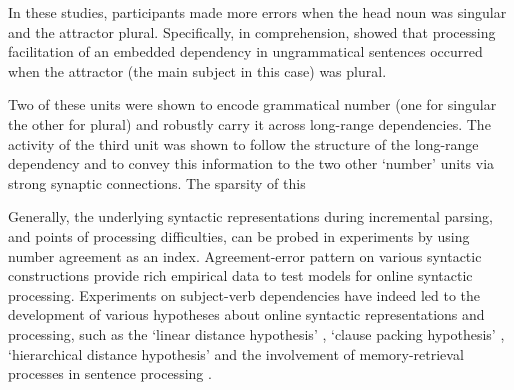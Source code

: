 In these studies, participants made more errors when the head noun was singular and the attractor plural. Specifically, in comprehension, \citet{wagers2009agreement} showed that processing facilitation of an embedded dependency in ungrammatical sentences occurred when the attractor (the main subject in this case) was plural.




Two of these units were shown to encode grammatical number (one for singular the other for plural) and robustly carry it across long-range dependencies. The activity of the third unit was shown to follow the structure of the long-range dependency and to convey this information to the two other `number' units via strong synaptic connections. The sparsity of this 


Generally, the underlying syntactic representations during incremental parsing, and points of processing difficulties, can be probed in experiments by using number agreement as an index. Agreement-error pattern on various syntactic constructions provide rich empirical data to test models for online syntactic processing. Experiments on subject-verb dependencies have indeed led to the development of various hypotheses about online syntactic representations and processing, such as the `linear distance hypothesis' \citep{}, `clause packing hypothesis' \citep{Bock:Miller:1991}, `hierarchical distance hypothesis' \citep{franck2002subject, franck2006agreement} and the involvement of memory-retrieval processes in sentence processing \citep{lewis2005activation, wagers2009agreement, lago2015agreement}.

